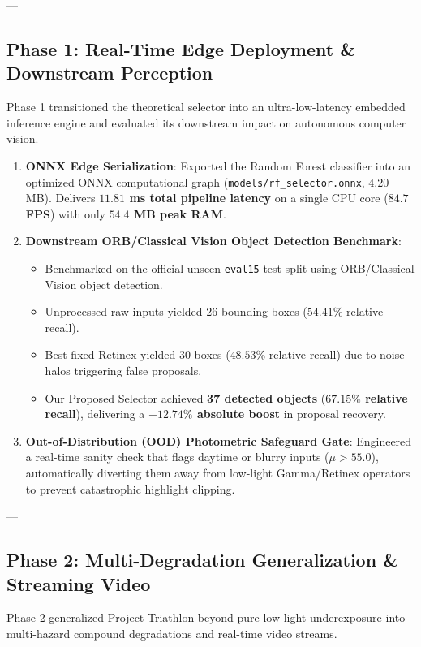 \documentclass[10pt,a4paper]{article}
\begin{document}
---

\subsection{Phase 1: Real-Time Edge Deployment \& Downstream Perception}
Phase 1 transitioned the theoretical selector into an ultra-low-latency embedded inference engine and evaluated its downstream impact on autonomous computer vision.

\begin{enumerate}[leftmargin=*]
    \item \textbf{ONNX Edge Serialization}: Exported the Random Forest classifier into an optimized ONNX computational graph (\texttt{models/rf\_selector.onnx}, $4.20$ MB). Delivers \textbf{$11.81$ ms total pipeline latency} on a single CPU core (\textbf{$84.7$ FPS}) with only \textbf{$54.4$ MB peak RAM}.
    \item \textbf{Downstream ORB/Classical Vision Object Detection Benchmark}:
    \begin{itemize}
        \item Benchmarked on the official unseen \texttt{eval15} test split using ORB/Classical Vision object detection.
        \item Unprocessed raw inputs yielded 26 bounding boxes ($54.41\%$ relative recall).
        \item Best fixed Retinex yielded 30 boxes ($48.53\%$ relative recall) due to noise halos triggering false proposals.
        \item Our Proposed Selector achieved \textbf{37 detected objects} (\textbf{$67.15\%$ relative recall}), delivering a \textbf{$+12.74\%$ absolute boost} in proposal recovery.
    \end{itemize}
    \item \textbf{Out-of-Distribution (OOD) Photometric Safeguard Gate}:
    Engineered a real-time sanity check that flags daytime or blurry inputs ($\mu > 55.0$), automatically diverting them away from low-light Gamma/Retinex operators to prevent catastrophic highlight clipping.
\end{enumerate}

---

\subsection{Phase 2: Multi-Degradation Generalization \& Streaming Video}
Phase 2 generalized Project Triathlon beyond pure low-light underexposure into multi-hazard compound degradations and real-time video streams.
\end{document}
